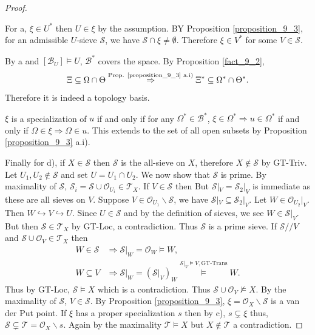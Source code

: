 \documentclass[8pt]{article}
\numberwithin{equation}{section}
\newcommand{\Ouv}{\mathscr{O}}
\newcommand{\sS}[0]{\mathscr{S}}
\newcommand{\sT}[0]{\mathscr{T}}
\newcommand{\cB}[0]{\mathcal{B}}
\begin{document}
\begin{proof}$\:$
    \par For a, $\xi\in U^*$ then $U\in \xi$ by the assumption. BY Proposition \ref{proposition_9_3}, for an admissible $U$-sieve $\sS$, we have $\sS\cap \xi\not=\emptyset$. Therefore $\xi\in V^*$ for some $V\in\sS$. 
    \par By a and $[\cB_U]\vDash U$, $\cB^*$ covers the space. By Proposition \ref{fact_9_2}, 
    \begin{equation*}
        \Xi\subseteq\Omega\cap\Theta\stackrel{\text{Prop. \ref{proposition_9_3} a.i)}}{\Rightarrow }\Xi^*\subseteq \Omega^*\cap\Theta^*.
    \end{equation*}
    Therefore it is indeed a topology basis.
    \par $\xi$ is a specialization of $u$ if and only if for any $\Omega^*\in\cB^*$, $\xi\in\Omega^*\Rightarrow u\in\Omega^*$ if and only if $\Omega\in\xi\Rightarrow \Omega\in u$. This extends to the set of all open subsets by Proposition \ref{proposition_9_3} a.i).
    \par Finally for d), if $X\in\sS$ then $\sS$ is the all-sieve on $X$, therefore $X\not\in\sS$ by GT-Triv. Let $U_1,U_2\not\in\sS$ and set $U=U_1\cap U_2$. We now show that $\sS$ is prime. By maximality of $\sS$, $\sS_i=\sS\cup\Ouv_{U_i}\in\mathcal{T}_X$. If $V\in\sS$ then But $\sS|_V=\sS_2|_V$ is immediate as these are all sieves on $V$. Suppose $V\in\Ouv_{U_1}\backslash \sS$, we have $\sS|_V\subseteq\sS_2|_V$. Let $W\in\Ouv_{U_2}|_V$. Then $W\hookrightarrow V\hookrightarrow U$. Since $U\in\sS$ and by the definition of sieves, we see $W\in\sS|_V$. 
    But then $\sS\in\mathcal{T}_X$ by GT-Loc, a contradiction. Thus $\sS$ is a prime sieve. If $\sS//V$ and $\sS\cup\Ouv_V\in\mathcal{T}_X$ then
    \begin{align*}
    W\in\sS&\Rightarrow \sS|_W = \Ouv_W\vDash W,\\
    W\subseteq V&\Rightarrow \sS|_W = (\sS|_V)_W \stackrel{\sS|_V\vDash V, \text{GT-Trans}}{\vDash} W.
    \end{align*}
    Thus by GT-Loc, $\sS\vDash X$ which is a contradiction. Thus $\sS\cup\Ouv_V\not\vDash X$. By the maximality of $\sS$, $V\in\sS$. By Proposition \ref{proposition_9_3}, $\xi=\Ouv_X\backslash\sS$ is a van der Put point. If $\xi$ has a proper specialization $s$ then by c), $s\subsetneq\xi$ thus, $\sS\subsetneq\mathscr{T}=\Ouv_X\backslash s$. Again by the maximality $\sT\vDash X$ but $X\not\in\sT$ a contradiction.
\end{proof}
\end{document}
